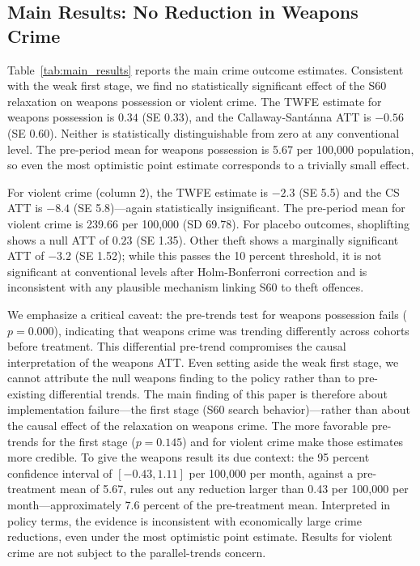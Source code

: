\documentclass[12pt]{article}
\begin{document}
\subsection{Main Results: No Reduction in Weapons Crime}

Table~\ref{tab:main_results} reports the main crime outcome estimates. Consistent with the weak first stage, we find no statistically significant effect of the S60 relaxation on weapons possession or violent crime. The TWFE estimate for weapons possession is $0.34$ (SE 0.33), and the Callaway-Sant\'{a}nna ATT is $-0.56$ (SE 0.60). Neither is statistically distinguishable from zero at any conventional level. The pre-period mean for weapons possession is 5.67 per 100,000 population, so even the most optimistic point estimate corresponds to a trivially small effect.



For violent crime (column 2), the TWFE estimate is $-2.3$ (SE 5.5) and the CS ATT is $-8.4$ (SE 5.8)---again statistically insignificant. The pre-period mean for violent crime is 239.66 per 100,000 (SD 69.78). For placebo outcomes, shoplifting shows a null ATT of $0.23$ (SE 1.35). Other theft shows a marginally significant ATT of $-3.2$ (SE 1.52); while this passes the 10 percent threshold, it is not significant at conventional levels after Holm-Bonferroni correction and is inconsistent with any plausible mechanism linking S60 to theft offences.

We emphasize a critical caveat: the pre-trends test for weapons possession fails ($p = 0.000$), indicating that weapons crime was trending differently across cohorts before treatment. This differential pre-trend compromises the causal interpretation of the weapons ATT. Even setting aside the weak first stage, we cannot attribute the null weapons finding to the policy rather than to pre-existing differential trends. The main finding of this paper is therefore about implementation failure---the first stage (S60 search behavior)---rather than about the causal effect of the relaxation on weapons crime. The more favorable pre-trends for the first stage ($p = 0.145$) and for violent crime make those estimates more credible. To give the weapons result its due context: the 95 percent confidence interval of $[-0.43, 1.11]$ per 100,000 per month, against a pre-treatment mean of 5.67, rules out any reduction larger than 0.43 per 100,000 per month---approximately 7.6 percent of the pre-treatment mean. Interpreted in policy terms, the evidence is inconsistent with economically large crime reductions, even under the most optimistic point estimate. Results for violent crime are not subject to the parallel-trends concern.
\end{document}
